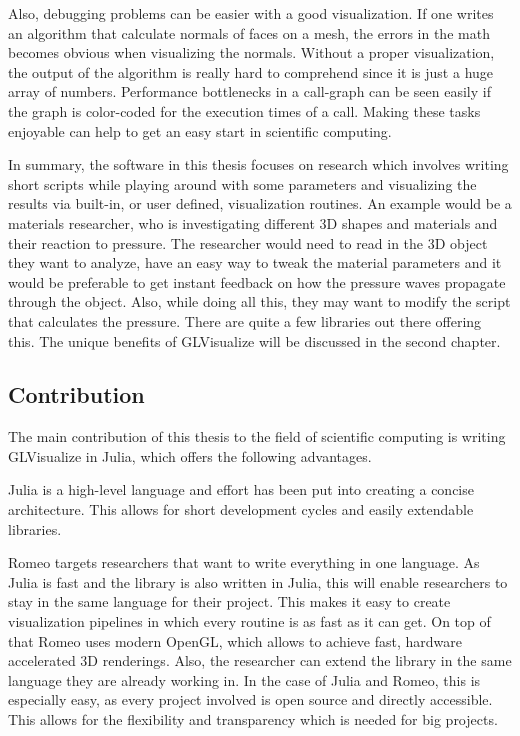 Also, debugging problems can be easier with a good visualization. 
If one writes an algorithm that calculate normals of faces on a mesh, the errors in the math becomes obvious when visualizing the normals. Without a proper visualization, the output of the algorithm is really hard to comprehend since it is just a huge array of numbers.
Performance bottlenecks in a call-graph can be seen easily if the graph is color-coded for the execution times of a call. 
Making these tasks enjoyable can help to get an easy start in scientific computing.

In summary, the software in this thesis focuses on research which involves writing short scripts while playing around with some parameters and visualizing the results via built-in, or user defined, visualization routines.
An example would be a materials researcher, who is investigating different 3D shapes and materials and their reaction to pressure.
The researcher would need to read in the 3D object they want to analyze, have an easy way to tweak the material parameters and it would be preferable to get instant feedback on how the pressure waves propagate through the object. Also, while doing all this, they may want to modify the script that calculates the pressure.
There are quite a few libraries out there offering this. 
The unique benefits of GLVisualize will be discussed in the second chapter.


\subsection{Contribution}

The main contribution of this thesis to the field of scientific computing is writing GLVisualize in Julia, which offers the following advantages.

Julia is a high-level language and effort has been put into creating a concise architecture. 
This allows for short development cycles and easily extendable libraries.

Romeo targets researchers that want to write everything in one language.
As Julia is fast and the library is also written in Julia, this will enable researchers to stay in the same language for their project. 
This makes it easy to create visualization pipelines in which every routine is as fast as it can get. 
On top of that Romeo uses modern \ac{OpenGL}, which allows to achieve fast, hardware accelerated 3D renderings.
Also, the researcher can extend the library in the same language they are already working in. 
In the case of Julia and Romeo, this is especially easy, as every project involved is open source and directly accessible.
This allows for the flexibility and transparency which is needed for big projects.

